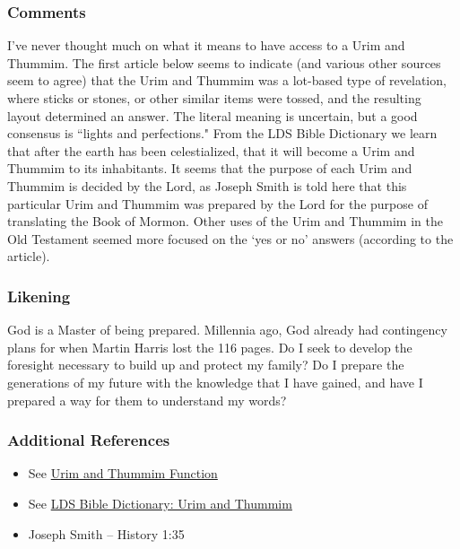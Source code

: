 \documentclass[12pt]{report}
\begin{document}
\subsubsection{Comments\label{js:comments8}}
I've never thought much on what it means to have access to a Urim and Thummim.  The first article below seems to indicate (and various other sources seem to agree) that the Urim and Thummim was a lot-based type of revelation, where sticks or stones, or other similar items were tossed, and the resulting layout determined an answer.  The literal meaning is uncertain, but a good consensus is ``lights and perfections."  From the LDS Bible Dictionary we learn that after the earth has been celestialized, that it will become a Urim and Thummim to its inhabitants.  It seems that the purpose of each Urim and Thummim is decided by the Lord, as Joseph Smith is told here that this particular Urim and Thummim was prepared by the Lord for the purpose of translating the Book of Mormon.  Other uses of the Urim and Thummim in the Old Testament seemed more focused on the `yes or no' answers (according to the article).

\subsubsection{Likening\label{js:likening8}}
God is a Master of being prepared.  Millennia ago, God already had contingency plans for when Martin Harris lost the 116 pages.  Do I seek to develop the foresight necessary to build up and protect my family?  Do I prepare the generations of my future with the knowledge that I have gained, and have I prepared a way for them to understand my words?

\subsubsection{Additional References\label{js:references8}}
\begin{itemize}
\item See \href{https://bible.org/question/how-did-urim-and-thummim-function}{Urim and Thummim Function}
\item See \href{https://www.lds.org/scriptures/bd/urim-and-thummim}{LDS Bible Dictionary: Urim and Thummim}
\item Joseph Smith -- History 1:35
\end{itemize}
\end{document}

